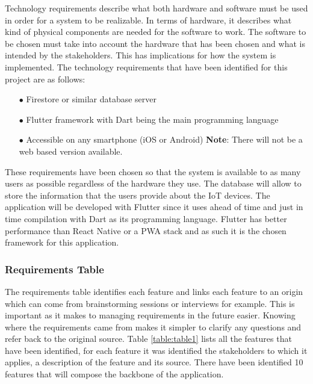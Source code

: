 Technology requirements describe what both hardware and software must be
used in order for a system to be realizable. In terms of hardware, it describes
what kind of physical components are needed for the software to work. The
software to be chosen must take into account the hardware that has been
chosen and what is intended by the stakeholders. This has implications for
how the system is implemented.
\newline
The technology requirements that have been identified for this project are as follows:
\begin{itemize}
    \item[$\bullet$] Firestore or similar database server
    \item[$\bullet$] Flutter framework with Dart being the main programming language
    \item[$\bullet$] Accessible on any smartphone (iOS or Android) \newline \textbf{Note}: There will not be a web based version available.
\end{itemize}
These requirements have been chosen so that the system is available to as
many users as possible regardless of the hardware they use. The database
will allow to store the information that the users provide about the IoT
devices. The application will be developed with Flutter since it uses ahead
of time and just in time compilation with Dart as its programming language.
Flutter has better performance than React Native or a PWA stack and as such it is the chosen framework for
this application.

\subsubsection{Requirements Table}

The requirements table identifies each feature and links each feature to an origin
which can come from brainstorming sessions or interviews for example.
This is important as it makes to managing requirements in the future easier.
Knowing where the requirements came from makes it simpler to clarify any questions
and refer back to the original source.
\newline
Table \ref{table:table1} lists all the features that have been identified, for
each feature it was identified the stakeholders to which it applies, a description
of the feature and its source. There have been identified 10 features that will
compose the backbone of the application.

